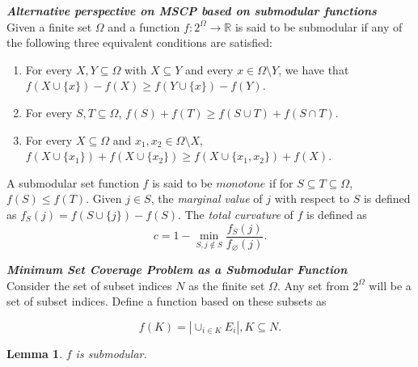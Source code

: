 \documentclass[12pt]{article}
\newcommand{\sr}{\mathbb{R}}
\newcommand{\labs}{\left|}
\newcommand{\rabs}{\right|}
\newcommand{\subheading}[1]{\emph{\textbf{#1}}}
\newtheorem{lem}[thm]{Lemma}
\begin{document}
\subheading{Alternative perspective on MSCP based on submodular functions}\\

Given a finite set $\Omega$ and a function $f:2^{\Omega} \rightarrow \sr$ is said to be submodular if any of the following three equivalent conditions are satisfied:

\begin{enumerate}
\item For every $X, Y \subseteq \Omega$ with $X \subseteq Y$ and every $x \in \Omega \setminus Y$, we have that $f(X \cup \{x\}) - f(X) \geq f(Y \cup \{x\}) - f(Y)$.
\item For every $S, T \subseteq \Omega$, $f(S) + f(T) \geq f(S \cup T) + f(S \cap T)$.
\item For every $X \subseteq \Omega$ and $x_1, x_2 \in \Omega \setminus X$, $f(X \cup \{x_1\}) + f(X \cup \{x_2\}) \geq f(X \cup \{x_1,x_2\}) + f(X)$.
\end{enumerate}

A submodular set function $f$ is said to be $monotone$ if for $S \subseteq T \subseteq \Omega$, $f(S) \leq f(T)$. Given $j \in S$, the \textit{marginal value} of $j$ with respect to $S$ is defined as $f_S(j) = f(S \cup \{j\}) - f(S)$. The \textit{total curvature} of $f$ is defined as
\[ c = 1 - \min_{S,j \notin S} \frac{f_S(j)}{f_{\varnothing}(j)}.\]

\subheading{Minimum Set Coverage Problem as a Submodular Function}\\

Consider the set of subset indices $N$ as the finite set $\Omega$. Any set from $2^{\Omega}$ will be a set of subset indices. Define a function based on these subsets as

\[f(K) = \labs \cup_{i \in K} E_i \rabs, K \subseteq N.\]

\begin{lem}\label{lem:submod}
$f$ is submodular.
\end{lem}
\end{document}
